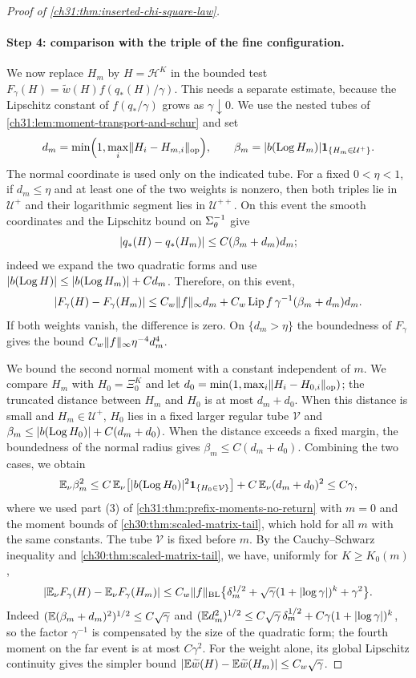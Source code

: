 \begin{proof}[Proof of \cref{ch31:thm:inserted-chi-square-law}]
\paragraph{Step 4: comparison with the triple of the fine configuration.}
We now replace $H_m$ by $H=\mathcal H^K$ in the bounded test $F_\gamma(H)=\widetilde w(H)f(q_*(H)/\gamma)$. This needs a separate estimate, because the Lipschitz constant of $f(q_*/\gamma)$ grows as $\gamma\downarrow0$. We use the nested tubes of \cref{ch31:lem:moment-transport-and-schur} and set
\[
 d_m=\min\Bigl(1,\max_i\lVert H_i-H_{m,i}\rVert_{\rm op}\Bigr),\qquad\beta_m=\lvert b(\operatorname{Log} H_m)\rvert\mathbf 1_{\{H_m\in\mathcal U^+\}}.
\]
The normal coordinate is used only on the indicated tube. For a fixed $0<\eta<1$, if $d_m\le\eta$ and at least one of the two weights is nonzero, then both triples lie in $\mathcal U^+$ and their logarithmic segment lies in $\mathcal U^{++}$. On this event the smooth coordinates and the Lipschitz bound on $\Sigma_\theta^{-1}$ give
\[
 \lvert q_*(H)-q_*(H_m)\rvert\le C(\beta_m+d_m)d_m;
\]
indeed we expand the two quadratic forms and use $\lvert b(\operatorname{Log} H)\rvert\le\lvert b(\operatorname{Log} H_m)\rvert+Cd_m$. Therefore, on this event,
\[
 \lvert F_\gamma(H)-F_\gamma(H_m)\rvert\le C_w\lVert f\rVert_\infty d_m+C_w\operatorname{Lip} f\,\gamma^{-1}(\beta_m+d_m)d_m.
\]
If both weights vanish, the difference is zero. On $\{d_m>\eta\}$ the boundedness of $F_\gamma$ gives the bound $C_w\lVert f\rVert_\infty\eta^{-4}d_m^4$.

We bound the second normal moment with a constant independent of $m$. We compare $H_m$ with $H_0=\Xi_0^K$ and let $d_0=\min(1,\max_i\lVert H_i-H_{0,i}\rVert_{\rm op})$; the truncated distance between $H_m$ and $H_0$ is at most $d_m+d_0$. When this distance is small and $H_m\in\mathcal U^+$, $H_0$ lies in a fixed larger regular tube $\mathcal V$ and $\beta_m\le\lvert b(\operatorname{Log} H_0)\rvert+C(d_m+d_0)$. When the distance exceeds a fixed margin, the boundedness of the normal radius gives $\beta_m\le C(d_m+d_0)$. Combining the two cases, we obtain
\[
 \mathbb E_\nu\beta_m^2\le C\,\mathbb E_\nu\bigl[\lvert b(\operatorname{Log} H_0)\rvert^2\mathbf 1_{\{H_0\in\mathcal V\}}\bigr]+C\,\mathbb E_\nu(d_m+d_0)^2\le C\gamma,
\]
where we used part (3) of \cref{ch31:thm:prefix-moments-no-return} with $m=0$ and the moment bounds of \cref{ch30:thm:scaled-matrix-tail}, which hold for all $m$ with the same constants. The tube $\mathcal V$ is fixed before $m$. By the Cauchy--Schwarz inequality and \cref{ch30:thm:scaled-matrix-tail}, we have, uniformly for $K\ge K_0(m)$,
\begin{equation}\label{ch31:eq:inserted-test-transport}
 \lvert \mathbb E_\nu F_\gamma(H)-\mathbb E_\nu F_\gamma(H_m)\rvert\le C_w\lVert f\rVert_{\rm BL}\bigl\{\delta_m^{1/2}+\sqrt\gamma(1+\lvert \log\gamma\rvert)^k+\gamma^2\bigr\}.
\end{equation}
Indeed $(\mathbb E(\beta_m+d_m)^2)^{1/2}\le C\sqrt\gamma$ and $(\mathbb E d_m^2)^{1/2}\le C\sqrt\gamma\,\delta_m^{1/2}+C\gamma(1+\lvert \log\gamma\rvert)^k$, so the factor $\gamma^{-1}$ is compensated by the size of the quadratic form; the fourth moment on the far event is at most $C\gamma^2$. For the weight alone, its global Lipschitz continuity gives the simpler bound $\lvert \mathbb E\widetilde w(H)-\mathbb E\widetilde w(H_m)\rvert\le C_w\sqrt\gamma$.


\end{proof}
